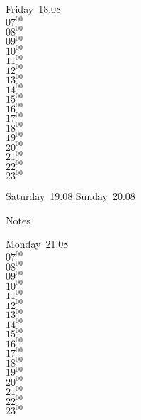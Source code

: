 \documentclass[11pt, a4paper]{book}\usepackage[]{graphicx}\usepackage[]{color}
\begin{document}
\begin{weekdaybox}
  Friday~18.08\\
  { 
  \vfill
  $07^{00}$\\
$08^{00}$\\
$09^{00}$\\
$10^{00}$\\
$11^{00}$\\
$12^{00}$\\
$13^{00}$\\
$14^{00}$\\
$15^{00}$\\
$16^{00}$\\
$17^{00}$\\
$18^{00}$\\
$19^{00}$\\
$20^{00}$\\
$21^{00}$\\
$22^{00}$\\
$23^{00}$\\
  }
\end{weekdaybox}
\begin{weekendbox}
  Saturday~19.08
  \tcblower
  Sunday~20.08
\end{weekendbox} %
\begin{notebox}
  Notes
\end{notebox}
\clearpage
\begin{headerbox}
\end{headerbox}
\begin{weekdaybox}
  Monday~21.08\\
  { 
  \vfill
  $07^{00}$\\
$08^{00}$\\
$09^{00}$\\
$10^{00}$\\
$11^{00}$\\
$12^{00}$\\
$13^{00}$\\
$14^{00}$\\
$15^{00}$\\
$16^{00}$\\
$17^{00}$\\
$18^{00}$\\
$19^{00}$\\
$20^{00}$\\
$21^{00}$\\
$22^{00}$\\
$23^{00}$\\
  }
\end{weekdaybox}
\end{document}
